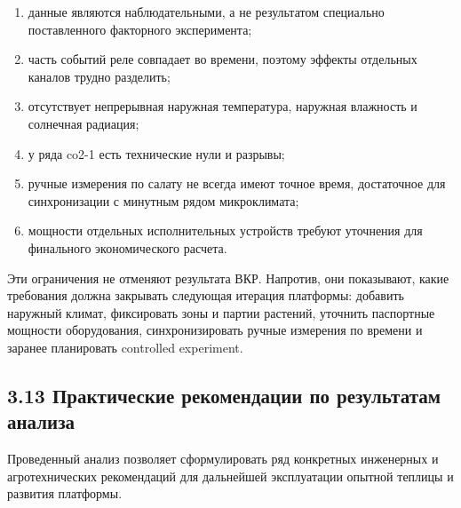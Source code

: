 \documentclass[a4paper,14pt]{extarticle}
\renewcommand{\texttt}[1]{\textnormal{#1}}
\providecommand{\tightlist}{%
  \setlength{\itemsep}{0pt}\setlength{\parskip}{0pt}}
\begin{document}
\begin{enumerate}
\def\labelenumi{\arabic{enumi})}
\tightlist
\item
  данные являются наблюдательными, а не результатом специально
  поставленного факторного эксперимента;
\item
  часть событий реле совпадает во времени, поэтому эффекты отдельных
  каналов трудно разделить;
\item
  отсутствует непрерывная наружная температура, наружная влажность и
  солнечная радиация;
\item
  у ряда \texttt{co2-1} есть технические нули и разрывы;
\item
  ручные измерения по салату не всегда имеют точное время, достаточное
  для синхронизации с минутным рядом микроклимата;
\item
  мощности отдельных исполнительных устройств требуют уточнения для
  финального экономического расчета.
\end{enumerate}

Эти ограничения не отменяют результата ВКР. Напротив, они показывают,
какие требования должна закрывать следующая итерация платформы: добавить
наружный климат, фиксировать зоны и партии растений, уточнить паспортные
мощности оборудования, синхронизировать ручные измерения по времени и
заранее планировать controlled experiment.

\hypertarget{ux43fux440ux430ux43aux442ux438ux447ux435ux441ux43aux438ux435-ux440ux435ux43aux43eux43cux435ux43dux434ux430ux446ux438ux438-ux43fux43e-ux440ux435ux437ux443ux43bux44cux442ux430ux442ux430ux43c-ux430ux43dux430ux43bux438ux437ux430}{%
\subsection{3.13 Практические рекомендации по результатам
анализа}\label{ux43fux440ux430ux43aux442ux438ux447ux435ux441ux43aux438ux435-ux440ux435ux43aux43eux43cux435ux43dux434ux430ux446ux438ux438-ux43fux43e-ux440ux435ux437ux443ux43bux44cux442ux430ux442ux430ux43c-ux430ux43dux430ux43bux438ux437ux430}}

Проведенный анализ позволяет сформулировать ряд конкретных инженерных и
агротехнических рекомендаций для дальнейшей эксплуатации опытной теплицы
и развития платформы.
\end{document}
